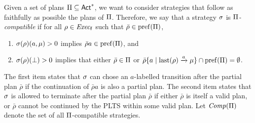 



Given a set of plans $\Pi\subseteq{\rm \sf Act}^*$, we want to consider
strategies that follow as faithfully as possible the plans of
$\Pi$.  Therefore, we say that a strategy $\sigma$ is
\emph{$\Pi$-compatible} if for all $\rho\in\mathit{Exec}_{\mathsf{f}}$ such that
$\bar{\rho}\in\mathrm{pref}(\Pi)$,
%
\begin{enumerate}
\item%
  $\sigma(\rho)(a,\mu)>0$ implies $\bar{\rho}a\in\mathrm{pref}(\Pi)$, and
\item%
  $\sigma(\rho)(\bot)>0$ implies that either
  $\bar{\rho}\in\Pi$ or
  $\bar{\rho}\{a\mid{\mathrm{last}(\rho)\xrightarrow{a}\mu}\}\cap\mathrm{pref}(\Pi) = \emptyset$. 
\end{enumerate}
%
The first item states that $\sigma$ can chose an $a$-labelled
transition after the partial plan $\bar{\rho}$ if the continuation of
$\bar{\rho}a$ is also a partial plan.
%
The second item states that $\sigma$ is allowed to terminate after the
partial plan $\bar{\rho}$ if either $\bar{\rho}$ is itself a valid
plan, or $\bar{\rho}$ cannot be continued by the PLTS within some
valid plan.
%
Let $\mathit{Comp}(\Pi)$ denote the set of all $\Pi$-compatible
strategies.
%


